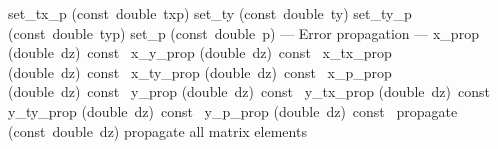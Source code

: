 \documentclass{article}
\begin{document}
\begin{cxxentry}
\begin{cxxclass}
\begin{cxxpublic}
        {set\_tx\_p}
        {(const\ double\ txp)}
        {										   }
        {}
\label{cxx.2.6.41}
        {set\_ty}
        {(const\ double\ ty)}
        {										   }
        {}
\label{cxx.2.6.42}
        {set\_ty\_p}
        {(const\ double\ typ)}
        {										   }
        {}
\label{cxx.2.6.43}
        {set\_p}
        {(const\ double\ p)}
        {										   }
        {}
\label{cxx.2.6.44}
\cxxitem{}
        {--- Error propagation --- }
        {}
        {}
        {}
\label{cxx.2.6.45}
        {x\_prop}
        {(double\ dz)\ const\ }
        {}
        {}
\label{cxx.2.6.46}
        {x\_y\_prop}
        {(double\ dz)\ const\ }
        {}
        {}
\label{cxx.2.6.47}
        {x\_tx\_prop}
        {(double\ dz)\ const\ }
        {}
        {}
\label{cxx.2.6.48}
        {x\_ty\_prop}
        {(double\ dz)\ const\ }
        {}
        {}
\label{cxx.2.6.49}
        {x\_p\_prop}
        {(double\ dz)\ const\ }
        {}
        {}
\label{cxx.2.6.50}
        {y\_prop}
        {(double\ dz)\ const\ }
        {}
        {}
\label{cxx.2.6.51}
        {y\_tx\_prop}
        {(double\ dz)\ const\ }
        {}
        {}
\label{cxx.2.6.52}
        {y\_ty\_prop}
        {(double\ dz)\ const\ }
        {}
        {}
\label{cxx.2.6.53}
        {y\_p\_prop}
        {(double\ dz)\ const\ }
        {}
        {}
\label{cxx.2.6.54}
        {propagate}
        {(const\ double\ dz)}
        { propagate all matrix elements}
        {}
\label{cxx.2.6.55}
\end{cxxpublic}
\end{cxxclass}
\end{cxxentry}
\begin{cxxClassGraph}
\label{cxx.}
\strut\\[5pt]\goodbreak
{}
\strut\\[5pt]\goodbreak
{}
\strut\\[5pt]\goodbreak
{}
\strut\\[5pt]\goodbreak
{}
\strut\\[5pt]\goodbreak
{}
\strut\\[5pt]\goodbreak
{}
\end{cxxClassGraph}
\end{document}
